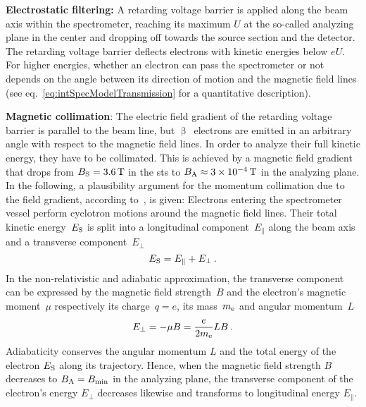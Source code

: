 {\par \textbf{Electrostatic filtering:}
A retarding voltage barrier is applied along the beam axis within the spectrometer, reaching its maximum $U$ at the so-called analyzing plane in the center and dropping off towards the source section and the detector. The retarding voltage barrier deflects electrons with kinetic energies below $eU$. For higher energies, whether an electron can pass the spectrometer or not depends on the angle between its direction of motion and the magnetic field lines (see eq.~\ref{eq:intSpecModelTransmission} for a quantitative description). 

{\par \textbf{Magnetic collimation}: 
The electric field gradient of the retarding voltage barrier is parallel to the beam line, but $\upbeta$~electrons are emitted in an arbitrary angle with respect to the magnetic field lines. In order to analyze their full kinetic energy, they have to be collimated. This is achieved by a magnetic field gradient that drops from $B_\mathrm{S}=\SI{3.6}{T}$ in the \gls{sts} to $B_\mathrm{A}\approx\SI{3e-4}{T}$ in the analyzing plane. In the following, a plausibility argument for the momentum collimation due to the field gradient, according to~\cite{Angrik:2005ep}, is given: Electrons entering the spectrometer vessel perform cyclotron motions around the magnetic field lines. Their total kinetic energy~$E_\mathrm{S}$ is split into a longitudinal component~$E_\parallel$ along the beam axis and a transverse component~$E_\bot$
\begin{equation}
\label{eq:totalKinElecEnergy}
E_\mathrm{S} = E_\parallel + E_\bot \text{\,.}
\end{equation}
In the non-relativistic and adiabatic approximation, the transverse component can be expressed by the magnetic field strength~$B$ and the electron's magnetic moment~$\mu$ respectively its charge~$q=e$, its mass~$m_{\mathrm{e}}$ and angular momentum~$L$~\cite{jackson1975classical}
\begin{equation}
E_\bot = - \mu B = \frac{e}{2 m_{\mathrm{e}}}LB \text{\,.}
\end{equation}
Adiabaticity conserves the angular momentum $L$ and the total energy of the electron $E_\mathrm{S}$ along its trajectory. Hence, when the magnetic field strength $B$ decreases to $B_\mathrm{A}=B_\mathrm{min}$ in the analyzing plane, the transverse component of the electron's energy $E_\bot$ decreases likewise and transforms to longitudinal energy $E_\parallel$.}

}
